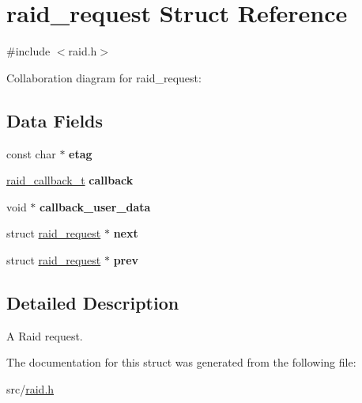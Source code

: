 \hypertarget{structraid__request}{}\section{raid\+\_\+request Struct Reference}
\label{structraid__request}


{\ttfamily \#include $<$raid.\+h$>$}



Collaboration diagram for raid\+\_\+request\+:
\subsection*{Data Fields}
\begin{DoxyCompactItemize}
\item 
const char $\ast$ {\bfseries etag}\hypertarget{structraid__request_a32412b4f6b6b84028fc52b427a4f889e}{}\label{structraid__request_a32412b4f6b6b84028fc52b427a4f889e}

\item 
\hyperlink{raid_8h_a2bafa5ba775b326961e18b29d22909e0}{raid\+\_\+callback\+\_\+t} {\bfseries callback}\hypertarget{structraid__request_acac4e6414ac74bb4758ebaa0001d116e}{}\label{structraid__request_acac4e6414ac74bb4758ebaa0001d116e}

\item 
void $\ast$ {\bfseries callback\+\_\+user\+\_\+data}\hypertarget{structraid__request_a3cfe56da8a96ae7ff00ef1346e3573da}{}\label{structraid__request_a3cfe56da8a96ae7ff00ef1346e3573da}

\item 
struct \hyperlink{structraid__request}{raid\+\_\+request} $\ast$ {\bfseries next}\hypertarget{structraid__request_a14beaa544f91e2dd268e1a53ab221035}{}\label{structraid__request_a14beaa544f91e2dd268e1a53ab221035}

\item 
struct \hyperlink{structraid__request}{raid\+\_\+request} $\ast$ {\bfseries prev}\hypertarget{structraid__request_a14dd864af154ab3d69442a0446b5d5cf}{}\label{structraid__request_a14dd864af154ab3d69442a0446b5d5cf}

\end{DoxyCompactItemize}


\subsection{Detailed Description}
A Raid request. 

The documentation for this struct was generated from the following file\+:\begin{DoxyCompactItemize}
\item 
src/\hyperlink{raid_8h}{raid.\+h}\end{DoxyCompactItemize}
